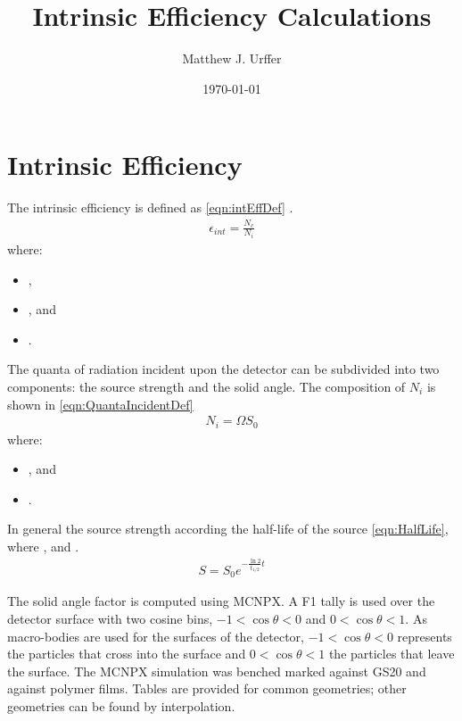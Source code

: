 \documentclass[draftcls,onecolumn]{IEEEtran}
\begin{document}
\title{Intrinsic Efficiency Calculations}
\author{Matthew J. Urffer}
\date{\today}
\maketitle

\printnomenclature
\printindex

\listoftodos
\tableofcontents
\listoffigures
\listoftables
\lstlistoflistings
\section{Intrinsic Efficiency}
The intrinsic efficiency is defined as \eqref{eqn:intEffDef} \cite{knoll_radiation_2009}.
\begin{align}
  \label{eqn:intEffDef}
  \epsilon_{int} = \frac{N_c}{N_i}
\end{align}
where:
\begin{itemize}
  \item[] ,
  \item[] , and
  \item[] .
\end{itemize}
The quanta of radiation incident upon the detector can be subdivided into two components: the source strength and the solid angle.
The composition of $N_i$ is shown in \eqref{eqn:QuantaIncidentDef}
\begin{align}
  \label{eqn:QuantaIncidentDef}
  N_i = \Omega S_0
\end{align}
where:
\begin{itemize}
  \item[] , and 
  \item[] .
\end{itemize}
In general the source strength according the half-life of the source \eqref{eqn:HalfLife}, where ,  and .
\begin{align}
  \label{eqn:HalfLife}
  S = S_0 e^{-\frac{\ln{2}}{t_{1/2}} t}
\end{align}

The solid angle factor is computed using MCNPX. 
A F1 tally is used over the detector surface with two cosine bins, $-1<\cos\theta<0$ and $0<\cos\theta<1$.
As macro-bodies are used for the surfaces of the detector, $-1<\cos\theta<0$ represents the particles that cross into the surface and $0<\cos\theta<1$ the particles that leave the surface.
The MCNPX simulation was benched marked against GS20 and against polymer films.
Tables are provided for common geometries; other geometries can be found by interpolation.
\end{document}
